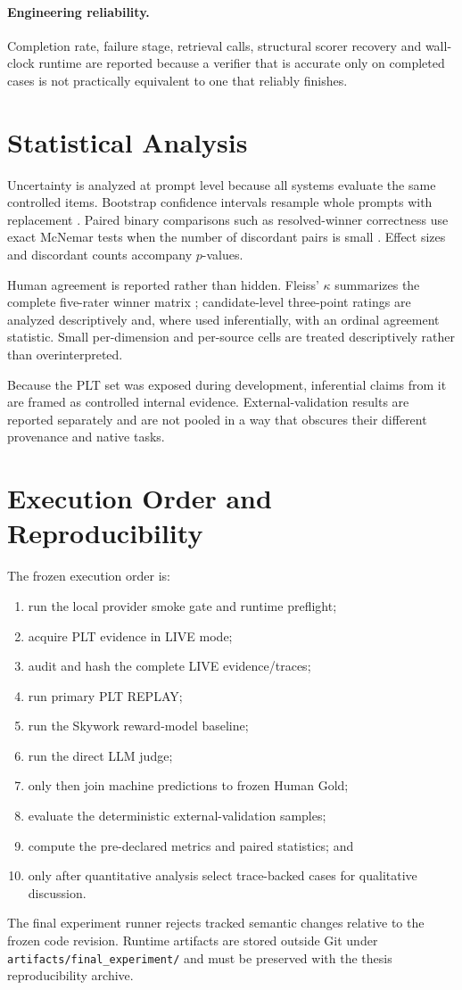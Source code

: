 \paragraph{Engineering reliability.}
Completion rate, failure stage, retrieval calls, structural scorer recovery and wall-clock runtime are reported because a verifier that is accurate only on completed cases is not practically equivalent to one that reliably finishes.

\section{Statistical Analysis}

Uncertainty is analyzed at prompt level because all systems evaluate the same controlled items. Bootstrap confidence intervals resample whole prompts with replacement \parencite{efron1993bootstrap}. Paired binary comparisons such as resolved-winner correctness use exact McNemar tests when the number of discordant pairs is small \parencite{mcnemar1947correlated}. Effect sizes and discordant counts accompany $p$-values.

Human agreement is reported rather than hidden. Fleiss' $\kappa$ summarizes the complete five-rater winner matrix \parencite{fleiss1971kappa}; candidate-level three-point ratings are analyzed descriptively and, where used inferentially, with an ordinal agreement statistic. Small per-dimension and per-source cells are treated descriptively rather than overinterpreted.

Because the PLT set was exposed during development, inferential claims from it are framed as controlled internal evidence. External-validation results are reported separately and are not pooled in a way that obscures their different provenance and native tasks.

\section{Execution Order and Reproducibility}

The frozen execution order is:
\begin{enumerate}
    \item run the local provider smoke gate and runtime preflight;
    \item acquire PLT evidence in LIVE mode;
    \item audit and hash the complete LIVE evidence/traces;
    \item run primary PLT REPLAY;
    \item run the Skywork reward-model baseline;
    \item run the direct LLM judge;
    \item only then join machine predictions to frozen Human Gold;
    \item evaluate the deterministic external-validation samples;
    \item compute the pre-declared metrics and paired statistics; and
    \item only after quantitative analysis select trace-backed cases for qualitative discussion.
\end{enumerate}

The final experiment runner rejects tracked semantic changes relative to the frozen code revision. Runtime artifacts are stored outside Git under \texttt{artifacts/final\_experiment/} and must be preserved with the thesis reproducibility archive.
